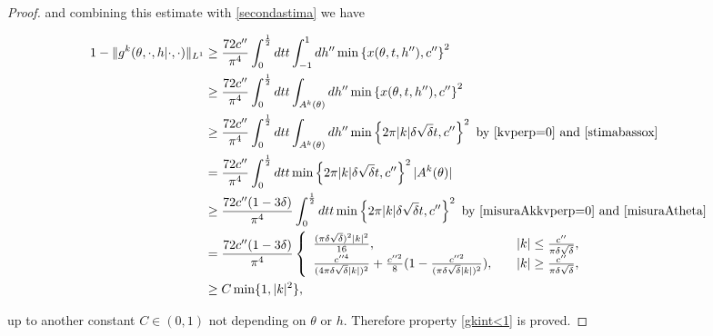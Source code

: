 \documentclass[a4paper,10pt,reqno]{amsart}
\numberwithin{equation}{subsection}
\numberwithin{figure}{subsection}
\begin{document}
\begin{proof}
and combining this estimate with \eqref{secondastima} we have

{\small\begin{align*}
1-\|g^k(\theta,\cdot,h|\cdot,\cdot)\|_{L^1}&\geq\frac{72c''}{\pi^4}\int_0^{\frac{1}{2}}dtt\int_{-1}^1dh''\min\left\{x(\theta,t,h''),c''\right\}^2
\\
&\geq\frac{72c''}{\pi^4}\int_0^{\frac{1}{2}}dtt\int_{A^k(\theta)}dh''\min\left\{x(\theta,t,h''),c''\right\}^2
\\
&\geq\frac{72c''}{\pi^4}\int_0^{\frac{1}{2}}dtt\int_{A^k(\theta)}dh''\min\left\{2\pi|k|\delta\sqrt\delta t,c''\right\}^2\textrm{ by \eqref{kvperp=0} and \eqref{stimabassox}}
\\
&=\frac{72c''}{\pi^4}\int_0^{\frac{1}{2}}dtt\min\left\{2\pi|k|\delta\sqrt\delta t,c''\right\}^2|A^k(\theta)|
\\
&\geq\frac{72c''(1-3\delta)}{\pi^4}\int_0^{\frac{1}{2}}dtt\min\left\{2\pi|k|\delta\sqrt\delta t,c''\right\}^2\textrm{ by \eqref{misuraAkkvperp=0} and \eqref{misuraAtheta}}
\\
&=\frac{72c''(1-3\delta)}{\pi^4}\left\{\begin{array}{lcr}\frac{(\pi\delta\sqrt\delta)^2|k|^2}{16},&&|k|\leq\frac{c''}{\pi\delta\sqrt\delta},\\\frac{c''^4}{(4\pi\delta\sqrt\delta|k|)^2}+\frac{c''^2}{8}(1-\frac{c''^2}{(\pi\delta\sqrt\delta|k|)^2}),&&|k|\geq\frac{c''}{\pi\delta\sqrt\delta},\end{array}\right.
\\
&\geq C\min\{1,|k|^2\},
\end{align*}}

up to another constant $C\in(0,1)$ not depending on $\theta$ or $h$. Therefore property \eqref{gkint<1} is proved.
\end{proof}

\newpage
\end{document}

